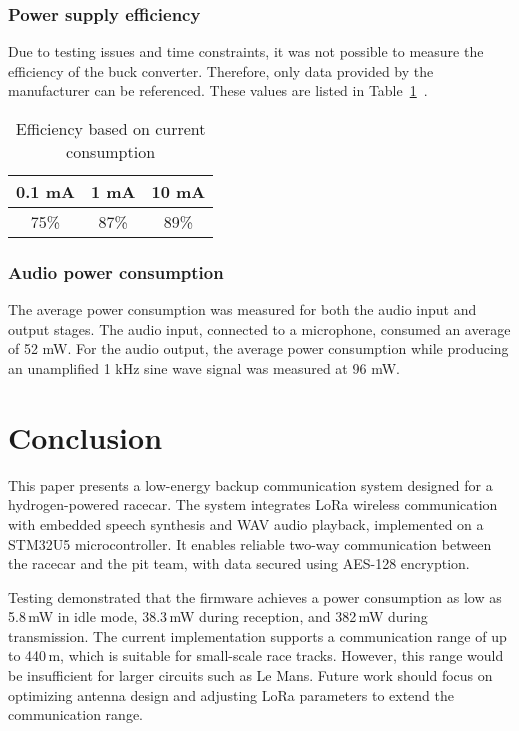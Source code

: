 \documentclass[conference]{IEEEtran}
\begin{document}
\subsubsection{Power supply efficiency}

Due to testing issues and time constraints, it was not possible to measure the efficiency of the buck converter.
Therefore, only data provided by the manufacturer can be referenced. These values are listed in Table~\ref{tab:power_suply_table}~\cite{TPS629203}.

\begin{table}[h]
  \centering
  \caption{Efficiency based on current consumption}
 \label{tab:power_suply_table}
  \begin{tabular}{|c|c|c|}
    \hline
    \textbf{0.1 mA} & \textbf{1 mA} & \textbf{10 mA} \\
    \hline
    75\% & 87\% & 89\% \\
    \hline
  \end{tabular}
\end{table}

\subsubsection{Audio power consumption}

The average power consumption was measured for both the audio input and output stages.
 The audio input, connected to a microphone, consumed an average of 52 mW. 
For the audio output, the average power consumption while producing an unamplified 1 kHz sine wave signal was measured at 96 mW.

\section{Conclusion}

This paper presents a low-energy backup communication system designed for a hydrogen-powered racecar. The system integrates LoRa wireless communication with embedded speech synthesis 
and WAV audio playback, implemented on a STM32U5 microcontroller. 
It enables reliable two-way communication between the racecar and the pit team, with data secured using AES-128 encryption.

Testing demonstrated that the firmware achieves a power consumption as low as 5.8\,mW in idle mode, 38.3\,mW during reception, and 382\,mW during transmission. 
The current implementation supports a communication range of up to 440\,m, which is suitable for small-scale race tracks. 
However, this range would be insufficient for larger circuits such as Le Mans. Future work should focus on optimizing antenna design and adjusting LoRa parameters to 
extend the communication range.
\end{document}
